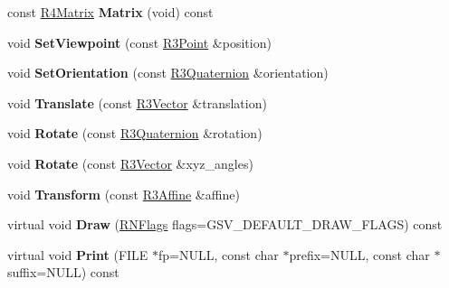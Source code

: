 \begin{DoxyCompactItemize}
\item 
const \hyperlink{class_r4_matrix}{R4\+Matrix} {\bfseries Matrix} (void) const \hypertarget{class_g_s_v_pose_a33948aed7e8459cade083f0fdadc7e5c}{}\label{class_g_s_v_pose_a33948aed7e8459cade083f0fdadc7e5c}

\item 
void {\bfseries Set\+Viewpoint} (const \hyperlink{class_r3_point}{R3\+Point} \&position)\hypertarget{class_g_s_v_pose_a81122257c988666e9ad114f128479b50}{}\label{class_g_s_v_pose_a81122257c988666e9ad114f128479b50}

\item 
void {\bfseries Set\+Orientation} (const \hyperlink{class_r3_quaternion}{R3\+Quaternion} \&orientation)\hypertarget{class_g_s_v_pose_ac8e259a65512ad173fe4af9a6dd0b69b}{}\label{class_g_s_v_pose_ac8e259a65512ad173fe4af9a6dd0b69b}

\item 
void {\bfseries Translate} (const \hyperlink{class_r3_vector}{R3\+Vector} \&translation)\hypertarget{class_g_s_v_pose_a1a557a2b9cac48f9701934a0dc719787}{}\label{class_g_s_v_pose_a1a557a2b9cac48f9701934a0dc719787}

\item 
void {\bfseries Rotate} (const \hyperlink{class_r3_quaternion}{R3\+Quaternion} \&rotation)\hypertarget{class_g_s_v_pose_a91aff541579b48f72f19941184c1c048}{}\label{class_g_s_v_pose_a91aff541579b48f72f19941184c1c048}

\item 
void {\bfseries Rotate} (const \hyperlink{class_r3_vector}{R3\+Vector} \&xyz\+\_\+angles)\hypertarget{class_g_s_v_pose_af692e88240238e796cbaeedb6259c5d2}{}\label{class_g_s_v_pose_af692e88240238e796cbaeedb6259c5d2}

\item 
void {\bfseries Transform} (const \hyperlink{class_r3_affine}{R3\+Affine} \&affine)\hypertarget{class_g_s_v_pose_a59568bd5cbc3416b6535704a4a550bc5}{}\label{class_g_s_v_pose_a59568bd5cbc3416b6535704a4a550bc5}

\item 
virtual void {\bfseries Draw} (\hyperlink{class_r_n_flags}{R\+N\+Flags} flags=G\+S\+V\+\_\+\+D\+E\+F\+A\+U\+L\+T\+\_\+\+D\+R\+A\+W\+\_\+\+F\+L\+A\+GS) const \hypertarget{class_g_s_v_pose_a9f6cf50fd5c6ee49e8a6013a6b04644e}{}\label{class_g_s_v_pose_a9f6cf50fd5c6ee49e8a6013a6b04644e}

\item 
virtual void {\bfseries Print} (F\+I\+LE $\ast$fp=N\+U\+LL, const char $\ast$prefix=N\+U\+LL, const char $\ast$suffix=N\+U\+LL) const \hypertarget{class_g_s_v_pose_aa2d0f827f02b77f17fcd90a30f132dbe}{}\label{class_g_s_v_pose_aa2d0f827f02b77f17fcd90a30f132dbe}

\end{DoxyCompactItemize}
